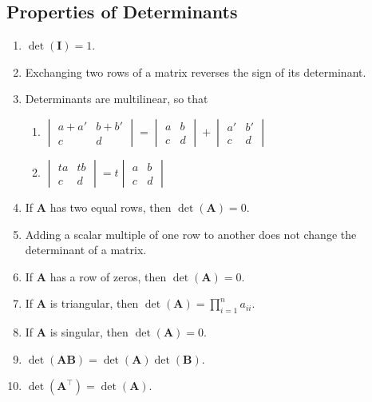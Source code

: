 \documentclass{article}
\begin{document}
\subsection{Properties of Determinants}
\begin{enumerate}
    \item \(\det{\left( \symbf{I} \right)}=1\).
    \item Exchanging two rows of a matrix reverses the sign of its
          determinant.
    \item Determinants are multilinear, so that
          \begin{enumerate}[label=(\alph*)]
              \item \(
                    \begin{vmatrix}
                        a+a' & b+b' \\
                        c    & d
                    \end{vmatrix}
                    =
                    \begin{vmatrix}
                        a & b \\
                        c & d
                    \end{vmatrix}
                    +
                    \begin{vmatrix}
                        a' & b' \\
                        c  & d
                    \end{vmatrix}
                    \)
              \item \(
                    \begin{vmatrix}
                        ta & tb \\
                        c  & d
                    \end{vmatrix}
                    = t
                    \begin{vmatrix}
                        a & b \\
                        c & d
                    \end{vmatrix}
                    \)
          \end{enumerate}
    \item If \(\symbf{A}\) has two equal rows, then \(\det{\left(
          \symbf{A} \right)}=0\).
    \item Adding a scalar multiple of one row to another does not
          change the determinant of a matrix.
    \item If \(\symbf{A}\) has a row of zeros, then \(\det{\left(
          \symbf{A} \right)}=0\).
    \item If \(\symbf{A}\) is triangular, then \(\det{\left( \symbf{A}
          \right)}=\prod_{i=1}^{n} a_{ii}\).
    \item If \(\symbf{A}\) is singular, then \(\det{\left( \symbf{A}
          \right)}=0\).
    \item \(\det{\left( \symbf{A}\symbf{B} \right)}=\det{\left( \symbf{A} \right)}\det{\left( \symbf{B} \right)}\).
    \item \(\det{\left( \symbf{A}^\top \right)}=\det{\left( \symbf{A} \right)}\).
\end{enumerate}
\end{document}
